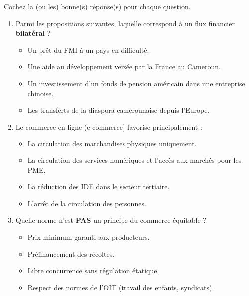 \documentclass[11pt]{article}
\begin{document}
\begin{exercice}
Cochez la (ou les) bonne(s) réponse(s) pour chaque question.
\begin{enumerate}
    \item Parmi les propositions suivantes, laquelle correspond à un flux financier \textbf{bilatéral} ?
    \begin{itemize}
        \item[A.] Un prêt du FMI à un pays en difficulté.
        \item[B.] Une aide au développement versée par la France au Cameroun.
        \item[C.] Un investissement d'un fonds de pension américain dans une entreprise chinoise.
        \item[D.] Les transferts de la diaspora camerounaise depuis l'Europe.
    \end{itemize}
    \item Le commerce en ligne (e-commerce) favorise principalement :
    \begin{itemize}
        \item[A.] La circulation des marchandises physiques uniquement.
        \item[B.] La circulation des services numériques et l'accès aux marchés pour les PME.
        \item[C.] La réduction des IDE dans le secteur tertiaire.
        \item[D.] L'arrêt de la circulation des personnes.
    \end{itemize}
    \item Quelle norme n'est \textbf{PAS} un principe du commerce équitable ?
    \begin{itemize}
        \item[A.] Prix minimum garanti aux producteurs.
        \item[B.] Préfinancement des récoltes.
        \item[C.] Libre concurrence sans régulation étatique.
        \item[D.] Respect des normes de l'OIT (travail des enfants, syndicats).
    \end{itemize}
\end{enumerate}
\end{exercice}
\end{document}
